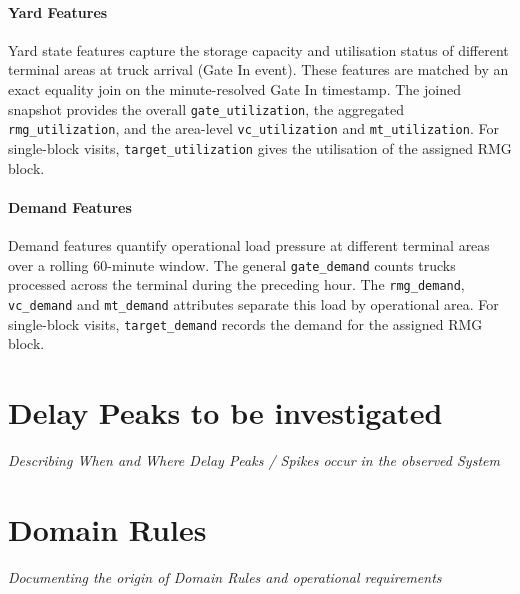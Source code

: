 \paragraph{Yard Features}

Yard state features capture the storage capacity and utilisation status
of different terminal areas at truck arrival (Gate In event). These
features are matched by an exact equality join on the minute-resolved Gate In
timestamp. The joined snapshot provides the overall
\texttt{gate\_utilization}, the aggregated \texttt{rmg\_utilization}, and
the area-level \texttt{vc\_utilization} and \texttt{mt\_utilization}. For
single-block visits, \texttt{target\_utilization} gives the utilisation of
the assigned RMG block.

\paragraph{Demand Features}

Demand features quantify operational load pressure at different
terminal areas over a rolling 60-minute window. The general
\texttt{gate\_demand} counts trucks processed across the terminal during the
preceding hour. The \texttt{rmg\_demand}, \texttt{vc\_demand} and
\texttt{mt\_demand} attributes separate this load by operational area.
For single-block visits, \texttt{target\_demand} records the demand for the
assigned RMG block.


\section{Delay Peaks to be investigated}
\textit{Describing When and Where Delay Peaks / Spikes occur in the observed  System}

\section{Domain Rules}
\textit{Documenting the origin of Domain Rules and operational requirements}